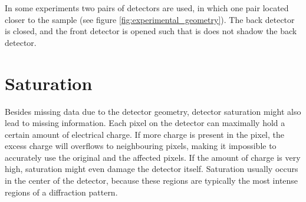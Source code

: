 In some experiments two pairs of detectors are used, in which one pair located closer to the sample (see figure \ref{fig:experimental_geometry}). The back detector is closed, and the front detector is opened such that is does not shadow the back detector.
 
\section{Saturation}
Besides missing data due to the detector geometry, detector saturation might also lead to missing information. Each pixel on the detector can maximally hold a certain amount of electrical charge. If more charge is present in the pixel, the excess charge will overflows to neighbouring pixels, making it impossible to accurately use the original and the
affected pixels. If the amount of charge is very high, saturation might even damage the detector itself. Saturation usually occurs in the center of the detector, because these regions are typically the most intense regions of a diffraction pattern. 




